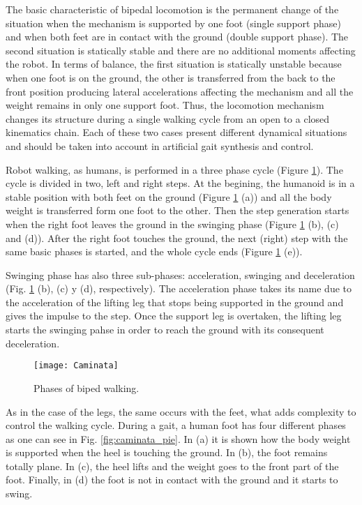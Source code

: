 The basic characteristic of bipedal locomotion is the permanent change of the situation when the mechanism is supported by one foot (single support phase) and when both feet are in contact with the ground (double support phase). The second situation is statically stable and there are no additional moments affecting the robot. In terms of balance, the first situation is statically unstable because when one foot is on the ground, the other is transferred from the back to the front position producing lateral accelerations affecting the mechanism and all the weight remains in only one support foot. Thus, the locomotion mechanism changes its structure during a single walking cycle from an open to a closed kinematics chain. Each of these two cases present different dynamical situations and should be taken into account in artificial gait synthesis and control.

Robot walking, as humans, is performed in a three phase cycle (Figure \ref{fig:caminata}). The cycle is divided in two, left and right steps. At the begining, the humanoid is in a stable position with both feet on the ground (Figure \ref{fig:caminata} (a)) and all the body weight is transferred form one foot to the other. Then the step generation starts when the right foot leaves the ground in the swinging phase (Figure \ref{fig:caminata} (b), (c) and (d)). After the right foot touches the ground, the next (right) step with the same basic phases is started, and the whole cycle ends (Figure \ref{fig:caminata} (e)).

Swinging phase has also three sub-phases: acceleration, swinging and deceleration (Fig. \ref{fig:caminata} (b), (c) y (d), respectively). The acceleration phase takes its name due to the acceleration of the lifting leg that stops being supported in the ground and gives the impulse to the step. Once the support leg is overtaken, the lifting leg starts the swinging pahse in order to reach the ground with its consequent deceleration.

\begin{figure}[!hbt]
\centering
\texttt{[image: Caminata]}
\caption{Phases of biped walking.}
\label{fig:caminata}
\end{figure}

As in the case of the legs, the same occurs with the feet, what adds complexity to control the walking cycle. During a gait, a human foot has four different phases as one can see in Fig. \ref{fig:caminata_pie}. In (a) it is shown how the body weight is supported when the heel is touching the ground. In (b), the foot remains totally plane. In (c), the heel lifts and the weight goes to the front part of the foot. Finally, in (d) the foot is not in contact with the ground and it starts to swing.

